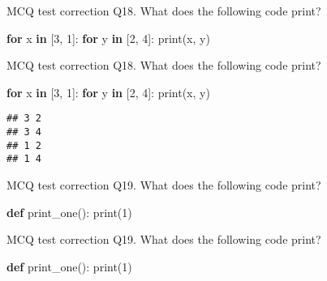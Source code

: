 \documentclass[
  8pt,
  ignorenonframetext,
]{beamer}
\newenvironment{Shaded}{\begin{snugshade}}{\end{snugshade}}
\newcommand{\BuiltInTok}[1]{#1}
\newcommand{\ControlFlowTok}[1]{\textcolor[rgb]{0.13,0.29,0.53}{\textbf{#1}}}
\newcommand{\DecValTok}[1]{\textcolor[rgb]{0.00,0.00,0.81}{#1}}
\newcommand{\KeywordTok}[1]{\textcolor[rgb]{0.13,0.29,0.53}{\textbf{#1}}}
\newcommand{\NormalTok}[1]{#1}
\begin{document}
\begin{frame}[fragile]{MCQ test correction}
\protect\hypertarget{mcq-test-correction-34}{}
Q18. What does the following code print?

\begin{Shaded}
\begin{Highlighting}[]
\ControlFlowTok{for}\NormalTok{ x }\KeywordTok{in}\NormalTok{ [}\DecValTok{3}\NormalTok{, }\DecValTok{1}\NormalTok{]:}
    \ControlFlowTok{for}\NormalTok{ y }\KeywordTok{in}\NormalTok{ [}\DecValTok{2}\NormalTok{, }\DecValTok{4}\NormalTok{]:}
        \BuiltInTok{print}\NormalTok{(x, y)}
\end{Highlighting}
\end{Shaded}
\end{frame}

\begin{frame}[fragile]{MCQ test correction}
\protect\hypertarget{mcq-test-correction-35}{}
Q18. What does the following code print?

\begin{Shaded}
\begin{Highlighting}[]
\ControlFlowTok{for}\NormalTok{ x }\KeywordTok{in}\NormalTok{ [}\DecValTok{3}\NormalTok{, }\DecValTok{1}\NormalTok{]:}
    \ControlFlowTok{for}\NormalTok{ y }\KeywordTok{in}\NormalTok{ [}\DecValTok{2}\NormalTok{, }\DecValTok{4}\NormalTok{]:}
        \BuiltInTok{print}\NormalTok{(x, y)}
\end{Highlighting}
\end{Shaded}

\begin{verbatim}
## 3 2
## 3 4
## 1 2
## 1 4
\end{verbatim}
\end{frame}

\begin{frame}[fragile]{MCQ test correction}
\protect\hypertarget{mcq-test-correction-36}{}
Q19. What does the following code print?

\begin{Shaded}
\begin{Highlighting}[]
\KeywordTok{def}\NormalTok{ print\_one():}
    \BuiltInTok{print}\NormalTok{(}\DecValTok{1}\NormalTok{)}
\end{Highlighting}
\end{Shaded}
\end{frame}

\begin{frame}[fragile]{MCQ test correction}
\protect\hypertarget{mcq-test-correction-37}{}
Q19. What does the following code print?

\begin{Shaded}
\begin{Highlighting}[]
\KeywordTok{def}\NormalTok{ print\_one():}
    \BuiltInTok{print}\NormalTok{(}\DecValTok{1}\NormalTok{)}
\end{Highlighting}
\end{Shaded}
\end{frame}
\end{document}
